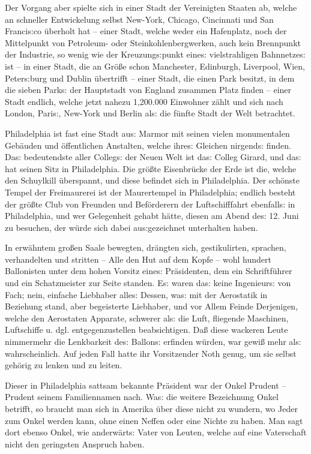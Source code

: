 \documentclass[oneside,12pt]{book}
\newcommand{\s}{s:}
\begin{document}
Der Vorgang aber spielte sich in einer Stadt der Vereinigten Staaten
ab, welche an schneller Entwickelung selbst New-York, Chicago,
Cincinnati und San Franci{\s}co \"uberholt hat -- einer Stadt, welche
weder ein Hafenplatz, noch der Mittelpunkt von Petroleum- oder
Steinkohlenbergwerken, auch kein Brennpunkt der Industrie, so wenig
wie der Kreuzung{\s}punkt eine{\s} vielstrahligen Bahnnetze{\s} ist
-- in einer Stadt, die an Gr\"o{\ss}e schon Manchester, Edinburgh,
Liverpool, Wien, Peter{\s}burg und Dublin \"ubertrifft -- einer
Stadt, die einen Park besitzt, in dem die sieben Park{\s} der
Hauptstadt von England zusammen Platz finden -- einer Stadt endlich,
welche jetzt nahezu 1,200.000 Einwohner z\"ahlt und sich nach London,
Pari{\s}, New-York und Berlin al{\s} die f\"unfte Stadt der Welt
betrachtet.

Philadelphia ist fast eine Stadt au{\s} Marmor mit seinen vielen
monumentalen Geb\"auden und \"offentlichen Anstalten, welche ihre{\s}
Gleichen nirgend{\s} finden. Da{\s} bedeutendste aller Colleg{\s} der
Neuen Welt ist da{\s} Colleg Girard, und da{\s} hat seinen Sitz in
Philadelphia. Die gr\"o{\ss}te Eisenbr\"ucke der Erde ist die, welche
den Schuylkill \"uberspannt, und diese befindet sich in Philadelphia.
Der sch\"onste Tempel der Freimaurerei ist der Maurertempel in
Philadelphia; endlich besteht der gr\"o{\ss}te Club von Freunden und
Bef\"orderern der Luftschifffahrt ebenfall{\s} in Philadelphia, und
wer Gelegenheit gehabt h\"atte, diesen am Abend de{\s} 12. Juni zu
besuchen, der w\"urde sich dabei au{\s}gezeichnet unterhalten haben.

In erw\"ahntem gro{\ss}en Saale bewegten, dr\"angten sich,
gestikulirten, sprachen, verhandelten und stritten -- Alle den Hut
auf dem Kopfe -- wohl hundert Ballonisten unter dem hohen Vorsitz
eine{\s} Pr\"asidenten, dem ein Schriftf\"uhrer und ein Schatzmeister
zur Seite standen. E{\s} waren da{\s} keine Ingenieur{\s} von Fach;
nein, einfache Liebhaber alle{\s} Dessen, wa{\s} mit der Aerostatik
in Beziehung stand, aber begeisterte Liebhaber, und vor Allem Feinde
Derjenigen, welche den Aerostaten Apparate, {\glqq}schwerer al{\s}
die Luft{\grqq}, fliegende Maschinen, Luftschiffe u. dgl.
entgegenzustellen beabsichtigen. Da{\ss} diese wackeren Leute
nimmermehr die Lenkbarkeit de{\s} Ballon{\s} erfinden w\"urden, war
gewi{\ss} mehr al{\s} wahrscheinlich. Auf jeden Fall hatte ihr
Vorsitzender Noth genug, um sie selbst geh\"orig zu lenken und zu
leiten.

Dieser in Philadelphia sattsam bekannte Pr\"asident war der Onkel
Prudent -- Prudent seinem Familiennamen nach. Wa{\s} die weitere
Bezeichnung {\glqq}Onkel{\grqq} betrifft, so braucht man sich in
Amerika \"uber diese nicht zu wundern, wo Jeder zum Onkel werden
kann, ohne einen Neffen oder eine Nichte zu haben. Man sagt dort
ebenso Onkel, wie anderw\"art{\s} Vater von Leuten, welche auf eine
Vaterschaft nicht den geringsten Anspruch haben.
\end{document}
